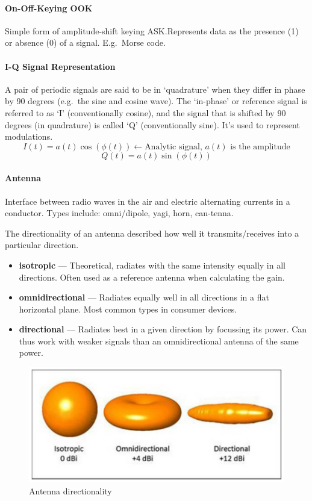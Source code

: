 \paragraph{On-Off-Keying OOK}
Simple form of amplitude-shift keying ASK.\@ Represents data as the presence
(1) or absence (0) of a signal. E.g.\ Morse code.

\paragraph{I-Q Signal Representation}
A pair of periodic signals are said to be in `quadrature' when they differ in
phase by 90 degrees (e.g.\ the sine and cosine wave). The `in-phase' or
reference signal is referred to as `I' (conventionally cosine), and the signal
that is shifted by 90 degrees (in quadrature) is called `Q' (conventionally
sine). It's used to represent modulations.
\[ I(t) = a(t) \cos (\phi(t)) \leftarrow  \textrm{Analytic signal, } a(t) \textrm{ is the amplitude}\]
\[ Q(t) = a(t) \sin (\phi(t)) \]

\paragraph{Antenna}
Interface between radio waves in the air and electric alternating currents in a
conductor. Types include: omni/dipole, yagi, horn, can-tenna.

The directionality of an antenna described how well it transmits/receives into
a particular direction.
\begin{itemize}
	\item \textbf{isotropic} --- Theoretical, radiates with the same intensity equally in all directions. Often used as a reference antenna when calculating the gain.
	\item \textbf{omnidirectional} --- Radiates equally well in all directions in a flat horizontal plane. Most common types in consumer devices.
	\item \textbf{directional} --- Radiates best in a given direction by focussing its power. Can thus work with weaker signals than an omnidirectional antenna of the same power.
\end{itemize}

\begin{figure}[h]
	\centering
	\includegraphics[scale=0.4]{images/1-directionality.png}
	\caption{Antenna directionality}%
	\label{fig:directionality}
\end{figure}

